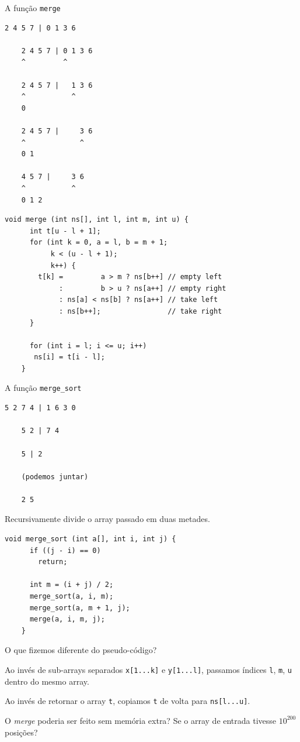 \documentclass{beamer}
\begin{document}
\begin{frame}{A função \texttt{merge}}

  \begin{lstlisting}[style=code]
    2 4 5 7 | 0 1 3 6

    2 4 5 7 | 0 1 3 6
    ^         ^

    2 4 5 7 |   1 3 6
    ^           ^
    0

    2 4 5 7 |     3 6
    ^             ^
    0 1

    4 5 7 |     3 6
    ^           ^
    0 1 2
  \end{lstlisting}

  \framebreak

  \begin{lstlisting}[style=normalc,caption=merge.c]
    void merge (int ns[], int l, int m, int u) {
      int t[u - l + 1];
      for (int k = 0, a = l, b = m + 1;
           k < (u - l + 1);
           k++) {
        t[k] =         a > m ? ns[b++] // empty left
             :         b > u ? ns[a++] // empty right
             : ns[a] < ns[b] ? ns[a++] // take left 
             : ns[b++];                // take right
      }
      
      for (int i = l; i <= u; i++)
       ns[i] = t[i - l];
    }
  \end{lstlisting}

\end{frame}


\begin{frame}{A função \texttt{merge\_sort}}

  \begin{lstlisting}[style=code]
    5 2 7 4 | 1 6 3 0

    5 2 | 7 4

    5 | 2

    (podemos juntar)

    2 5 
  \end{lstlisting}

  Recursivamente divide o array passado em duas metades.

  \framebreak

  \begin{lstlisting}[style=normalc,caption=merge.c]
    void merge_sort (int a[], int i, int j) {
      if ((j - i) == 0)
        return;
      
      int m = (i + j) / 2;
      merge_sort(a, i, m);
      merge_sort(a, m + 1, j);  
      merge(a, i, m, j);
    }
  \end{lstlisting}

  \framebreak

  O que fizemos diferente do pseudo-código?

  Ao invés de sub-arrays separados \texttt{x[1...k]} e
  \texttt{y[1...l]}, passamos índices \texttt{l}, \texttt{m},
  \texttt{u} dentro do mesmo array.

  Ao invés de retornar o array \texttt{t}, copiamos \texttt{t} de
  volta para \texttt{ns[l...u]}.

  O \emph{merge} poderia ser feito sem memória extra? Se o array de
  entrada tivesse $10^{200}$ posições?

\end{frame}
\end{document}

